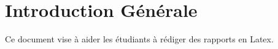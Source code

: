 \chapter*{Introduction G\'en\'erale}

Ce document vise à aider les étudiants à rédiger des rapports en Latex.

